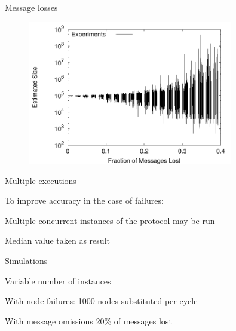 \begin{frame}{Message losses}

\begin{figure}
\includegraphics[width=0.80\textwidth]{newscast-fail-asym}
\end{figure}

		
\end{frame}

\begin{frame}{Multiple executions}

\BIL
\item To improve accuracy in the case of failures:
	\BI
	\item Multiple concurrent instances of the protocol may be run
	\item Median value taken as result
	\EI
\item Simulations
	\BI
	\item Variable number of instances
	\item With node failures: 1000 nodes substituted per cycle
	\item With message omissions 20\% of messages lost
	\EI
\EIL
	
\end{frame}


